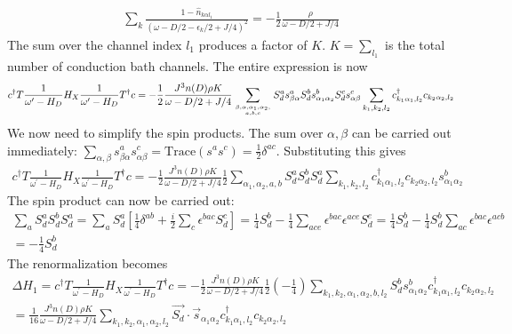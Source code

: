 \documentclass[12pt]{revtex4-2}
\begin{document}
\begin{align}
	\sum_k \frac{1 - \hat n_{k\alpha l_1}}{\left(\omega - D/2 -\epsilon_k/2 + J/4\right)^2} = -\frac{1}{2}\frac{\rho}{\omega - D/2 + J/4}
\end{align}
The sum over the channel index \(l_1\) produces a factor of \(K\). \(K = \sum_{l_1}\) is the total number of conduction bath channels. The entire expression is now
\begin{align}
	\label{first_term}
	c^\dagger T \frac{1}{\omega^\prime - H_D} H_X \frac{1}{\omega^\prime - H_D} T^\dagger c = -\frac{1}{2}\frac{J^3 n(D) \rho K}{\omega - D/2 + J/4}\sum_{\beta, \alpha, \alpha_1,\alpha_2,\atop{a,b,c}} S_d^a s^a_{\beta \alpha} S_d^b s^b_{\alpha_1 \alpha_2} S_d^c s^c_{\alpha \beta} \sum_{k_1,k_2,l_2} c^\dagger_{k_1\alpha_1,l_2}c_{k_2 \alpha_2,l_2}
\end{align}
We now need to simplify the spin products. The sum over \(\alpha,\beta\) can be carried out immediately: \(\sum_{\alpha,\beta} s^a_{\beta \alpha} s^c_{\alpha \beta} = \text{Trace}\left(s^a s^c\right) = \frac{1}{2}\delta^{ac}\). Substituting this gives
\begin{align}
	c^\dagger T \frac{1}{\omega^\prime - H_D} H_X \frac{1}{\omega^\prime - H_D} T^\dagger c = -\frac{1}{2}\frac{J^3 n(D) \rho K}{\omega - D/2 + J/4}\frac{1}{2}\sum_{\alpha_1,\alpha_2,a,b} S_d^a S_d^b S_d^a \sum_{k_1,k_2,l_2} c^\dagger_{k_1\alpha_1,l_2}c_{k_2 \alpha_2,l_2}s^b_{\alpha_1 \alpha_2} 
\end{align}
The spin product can now be carried out:
\begin{align}
	\sum_a S_d^a S_d^b S_d^a = \sum_a S_d^a\left[\frac{1}{4}\delta^{ab} + \frac{i}{2}\sum_c \epsilon^{bac}S_d^c\right] = \frac{1}{4}S_d^b - \frac{1}{4}\sum_{ace}\epsilon^{bac}\epsilon^{ace}S_d^e = \frac{1}{4}S_d^b - \frac{1}{4}S_d^b \sum_{ac}\epsilon^{bac}\epsilon^{acb} \\
	= -\frac{1}{4}S_d^b
\end{align}
The renormalization becomes
\begin{align}
	\Delta H_1 = c^\dagger T \frac{1}{\omega^\prime - H_D} H_X \frac{1}{\omega^\prime - H_D} T^\dagger c = -\frac{1}{2}\frac{J^3 n(D) \rho K}{\omega - D/2 + J/4}\frac{1}{2}\left( -\frac{1}{4} \right) \sum_{k_1,k_2,\alpha_1,\alpha_2,b,l_2} S_d^b s^b_{\alpha_1 \alpha_2} c^\dagger_{k_1\alpha_1,l_2}c_{k_2 \alpha_2,l_2}\\
=\frac{1}{16}\frac{J^3 n(D) \rho K}{\omega - D/2 + J/4} \sum_{k_1,k_2,\alpha_1,\alpha_2,l_2} \vec{S_d}\cdot\vec{s}_{\alpha_1 \alpha_2} c^\dagger_{k_1\alpha_1,l_2}c_{k_2 \alpha_2,l_2}
\end{align}
\end{document}

